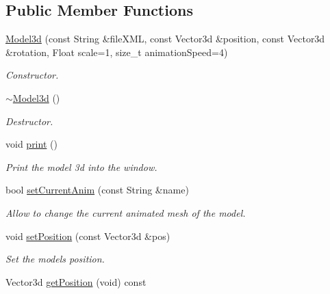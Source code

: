 \subsection*{Public Member Functions}
\begin{DoxyCompactItemize}
\item 
\hyperlink{classModel3d_a3382c1519f85b695a1d98b492207c339}{Model3d} (const String \&file\+X\+ML, const Vector3d \&position, const Vector3d \&rotation, Float scale=1, size\+\_\+t animation\+Speed=4)
\begin{DoxyCompactList}\small\item\em Constructor. \end{DoxyCompactList}\item 
\mbox{\label{classModel3d_a7a4ec3be34c901538574d99d95a46b04}} 
\hyperlink{classModel3d_a7a4ec3be34c901538574d99d95a46b04}{$\sim$\+Model3d} ()
\begin{DoxyCompactList}\small\item\em Destructor. \end{DoxyCompactList}\item 
\mbox{\label{classModel3d_ab1d6c9347c05323f85e5decb7e73cd1e}} 
void \hyperlink{classModel3d_ab1d6c9347c05323f85e5decb7e73cd1e}{print} ()
\begin{DoxyCompactList}\small\item\em Print the model 3d into the window. \end{DoxyCompactList}\item 
bool \hyperlink{classModel3d_a40ce7d80e574541b402f646ea31f29cd}{set\+Current\+Anim} (const String \&name)
\begin{DoxyCompactList}\small\item\em Allow to change the current animated mesh of the model. \end{DoxyCompactList}\item 
void \hyperlink{classModel3d_a971b77ce978903443e71187ceafa1528}{set\+Position} (const Vector3d \&pos)
\begin{DoxyCompactList}\small\item\em Set the model\textquotesingle{}s position. \end{DoxyCompactList}\item 
\mbox{\label{classModel3d_ac40de3ff1527b92c7eadc80766c87824}} 
Vector3d \hyperlink{classModel3d_ac40de3ff1527b92c7eadc80766c87824}{get\+Position} (void) const

\end{DoxyCompactItemize}
